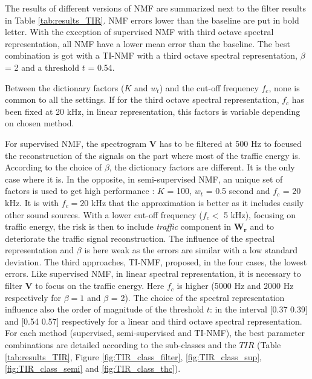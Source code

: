 \documentclass[twocolumn,a4paper,10pt]{article}
\begin{document}
The results of different versions of NMF are summarized next to the filter results in Table \ref{tab:results_TIR}. NMF errors lower than the baseline are put in bold letter. With the exception of supervised NMF with third octave spectral representation, all NMF have a lower mean error than the baseline. The best combination is got with a TI-NMF with a third octave spectral representation, $\beta$ = 2 and a threshold $t$ = 0.54.

Between the dictionary factors ($K$ and $w_t$) and the cut-off frequency $f_c$, none is common to all the settings. If for the third octave spectral representation, $f_c$ has been fixed at 20 kHz, in linear representation, this factors is variable depending on chosen method.

For supervised NMF, the spectrogram $\mathbf{V}$ has to be filtered at 500 Hz to focused the reconstruction of the signals on the part where most of the traffic energy is. According to the choice of $\beta$, the dictionary factors are different. It is the only case where it is.
In the opposite, in semi-supervised NMF, an unique set of factors is used to get high performance : $K$ = 100, $w_t$ = 0.5 second and $f_c$ = 20 kHz. It is with $f_c = 20$ kHz that the approximation is better as it includes easily other sound sources. With a lower cut-off frequency ($ f_c <$ 5 kHz), focusing on traffic energy, the risk is then to include \textit{traffic} component in $\mathbf{W_r}$ and to deteriorate the traffic signal reconstruction. The influence of the spectral representation and $\beta$ is here weak as the errors are similar with a low standard deviation. The third approaches, TI-NMF, proposed, in the four cases, the lowest errors. Like supervised NMF, in linear spectral representation, it is necessary to filter $\mathbf{V}$ to focus on the traffic energy. Here $f_c$ is higher (5000 Hz and 2000 Hz respectively for $\beta = 1$ and $\beta$ = 2). The choice of the spectral representation influence also the order of magnitude of the threshold $t$: in the interval [0.37 0.39] and [0.54 0.57] respectively for a linear and third octave spectral representation.\\

For each method (supervised, semi-supervised and TI-NMF), the best parameter combinations are detailed according to the sub-classes and the $TIR$ (Table \ref{tab:results_TIR},  Figure \ref{fig:TIR_class_filter}, \ref{fig:TIR_class_sup}, \ref{fig:TIR_class_semi} and \ref{fig:TIR_class_thc}). \\
\end{document}
